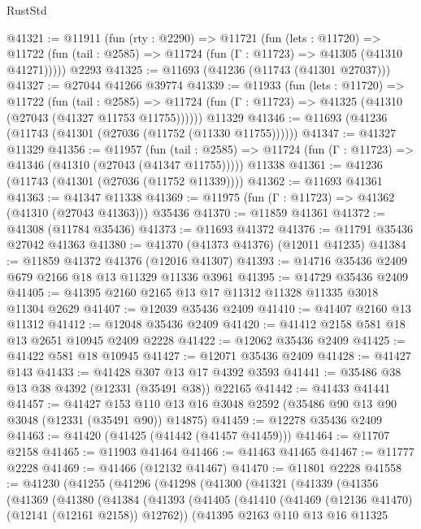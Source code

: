 \begin{lexlean}{RustStd}
\begin{coremodule}
@41321 := @11911
    (fun (rty : @2290) =>
    @11721
      (fun (lets : @11720) =>
      @11722 (fun (tail : @2585) => @11724 (fun (Γ : @11723) => @41305 (@41310 @41271)))))
    @2293
@41325 := @11693 (@41236 (@11743 (@41301 @27037)))
@41327 := @27044 @41266 @39774
@41339 := @11933
    (fun (lets : @11720) =>
    @11722
      (fun (tail : @2585) =>
      @11724 (fun (Γ : @11723) => @41325 (@41310 (@27043 (@41327 @11753 @11755))))))
    @11329
@41346 := @11693 (@41236 (@11743 (@41301 (@27036 (@11752 (@11330 @11755))))))
@41347 := @41327 @11329
@41356 := @11957
    (fun (tail : @2585) => @11724 (fun (Γ : @11723) => @41346 (@41310 (@27043 (@41347 @11755)))))
    @11338
@41361 := @41236 (@11743 (@41301 (@27036 (@11752 @11339))))
@41362 := @11693 @41361
@41363 := @41347 @11338
@41369 := @11975 (fun (Γ : @11723) => @41362 (@41310 (@27043 @41363))) @35436
@41370 := @11859 @41361
@41372 := @41308 (@11784 @35436)
@41373 := @11693 @41372
@41376 := @11791 @35436 @27042 @41363
@41380 := @41370 (@41373 @41376) (@12011 @41235)
@41384 := @11859 @41372 @41376 (@12016 @41307)
@41393 := @14716 @35436 @2409 @679 @2166 @18 @13 @11329 @11336 @3961
@41395 := @14729 @35436 @2409
@41405 := @41395 @2160 @2165 @13 @17 @11312 @11328 @11335 @3018 @11304 @2629
@41407 := @12039 @35436 @2409
@41410 := @41407 @2160 @13 @11312
@41412 := @12048 @35436 @2409
@41420 := @41412 @2158 @581 @18 @13 @2651 @10945 @2409 @2228
@41422 := @12062 @35436 @2409
@41425 := @41422 @581 @18 @10945
@41427 := @12071 @35436 @2409
@41428 := @41427 @143
@41433 := @41428 @307 @13 @17 @4392 @3593
@41441 := @35486 @38 @13 @38 @4392 (@12331 (@35491 @38)) @22165
@41442 := @41433 @41441
@41457 := @41427
    @153
    @110
    @13
    @16
    @3048
    @2592
    (@35486 @90 @13 @90 @3048 (@12331 (@35491 @90)) @14875)
@41459 := @12278 @35436 @2409
@41463 := @41420 (@41425 (@41442 (@41457 @41459)))
@41464 := @11707 @2158
@41465 := @11903 @41464
@41466 := @41463 @41465
@41467 := @11777 @2228
@41469 := @41466 (@12132 @41467)
@41470 := @11801 @2228
@41558 := @41230
    (@41255
      (@41296
        (@41298
          (@41300
            (@41321
              (@41339
                (@41356
                  (@41369
                    (@41380
                      (@41384
                        (@41393
                          (@41405
                            (@41410 (@41469 (@12136 @41470) (@12141 (@12161 @2158)) @12762))
                            (@41395
                              @2163
                              @110
                              @13
                              @16
                              @11325

\end{coremodule}
\end{lexlean}
